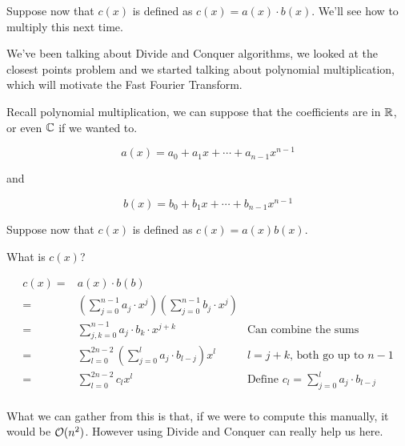 \documentclass[12pt]{article}
\begin{document}
  Suppose now that $c(x)$ is defined as $c(x) = a(x) \cdot b(x)$. We'll see how to
  multiply this next time.



  We've been talking about Divide and Conquer algorithms, we looked at the
  closest points problem and we started talking about polynomial multiplication,
  which will motivate the Fast Fourier Transform.

  Recall polynomial multiplication, we can suppose that the coefficients are in
  ${\mathbb R}$, or even ${\mathbb C}$ if we wanted to.

  \[
    a(x) = a_0 + a_1x + \cdots + a_{n - 1}x^{n - 1}
  \]

  and

  \[
    b(x) = b_0 + b_1x + \cdots + b_{n - 1}x^{n - 1}
  \]

  Suppose now that $c(x)$ is defined as $c(x) = a(x) b(x)$.

  What is $c(x)$?

  \begin{align*}
    c(x) =&a(x) \cdot b(b) \\
         =&\left(\sum_{j = 0}^{n - 1}a_j \cdot x^j\right)\left(\sum_{j = 0}^{n - 1}b_j \cdot x^j\right) \\
         =&\sum_{j,k = 0}^{n - 1} a_j \cdot b_k \cdot x^{j + k} & \text{Can combine the sums} \\
         =&\sum_{l = 0}^{2n - 2} \left( \sum_{j = 0}^{l} a_j \cdot b_{l - j} \right) x^l & \text{$l = j + k$, both go up to $n - 1$} \\
         =&\sum_{l = 0}^{2n - 2} c_l x^l & \text{Define $c_l = \sum_{j = 0}^{l} a_j \cdot b_{l - j}$} \\
  \end{align*}


  What we can gather from this is that, if we were to compute this manually, it
  would be $\mathcal O(n^2)$. However using Divide and Conquer can really help us here.
\end{document}
